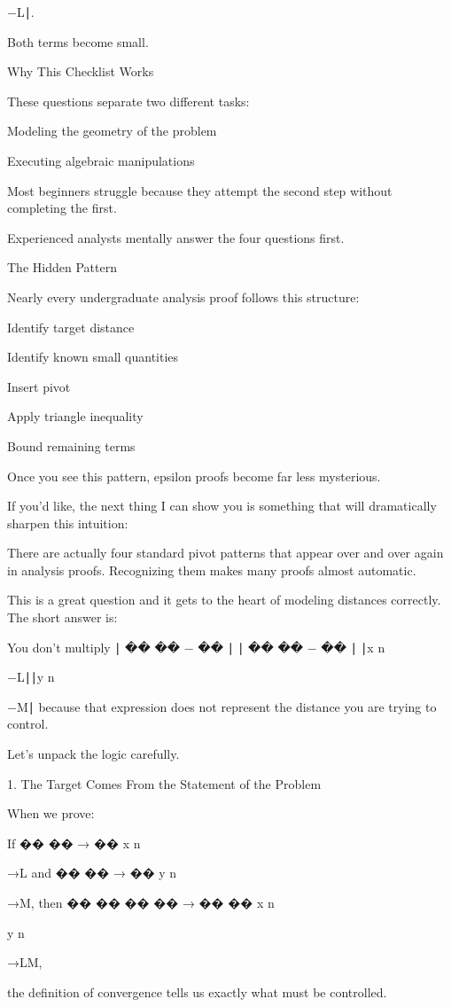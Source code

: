 −L∣.

Both terms become small.

Why This Checklist Works

These questions separate two different tasks:

Modeling the geometry of the problem

Executing algebraic manipulations

Most beginners struggle because they attempt the second step without completing the first.

Experienced analysts mentally answer the four questions first.

The Hidden Pattern

Nearly every undergraduate analysis proof follows this structure:

Identify target distance

Identify known small quantities

Insert pivot

Apply triangle inequality

Bound remaining terms

Once you see this pattern, epsilon proofs become far less mysterious.

If you'd like, the next thing I can show you is something that will dramatically sharpen this intuition:

There are actually four standard pivot patterns that appear over and over again in analysis proofs. Recognizing them makes many proofs almost automatic.

This is a great question and it gets to the heart of modeling distances correctly. The short answer is:

You don’t multiply 
∣
��
��
−
��
∣
∣
��
��
−
��
∣
∣x
n
	​

−L∣∣y
n
	​

−M∣ because that expression does not represent the distance you are trying to control.

Let’s unpack the logic carefully.

1. The Target Comes From the Statement of the Problem

When we prove:

If 
��
��
→
��
x
n
	​

→L and 
��
��
→
��
y
n
	​

→M, then 
��
��
��
��
→
��
��
x
n
	​

y
n
	​

→LM,

the definition of convergence tells us exactly what must be controlled.

